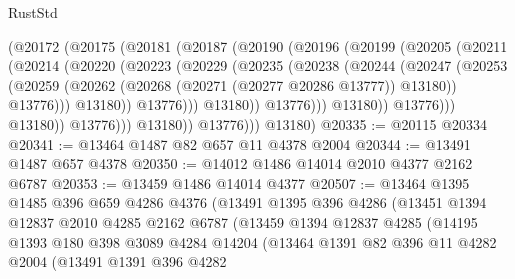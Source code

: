 \begin{lexlean}{RustStd}
\begin{coremodule}
{\begin{coremodule}
{{{{{{{{{{{{{{{{{{{{{{{{{{{{{{{                        (@20172
                          (@20175
                            (@20181
                              (@20187
                                (@20190
                                  (@20196
                                    (@20199
                                      (@20205
                                        (@20211
                                          (@20214
                                            (@20220
                                              (@20223
                                                (@20229
                                                  (@20235
                                                    (@20238
                                                      (@20244
                                                        (@20247
                                                          (@20253
                                                            (@20259
                                                              (@20262
                                                                (@20268
                                                                  (@20271 (@20277 @20286 @13777))
                                                                  @13180))
                                                              @13776)))
                                                        @13180))
                                                    @13776)))
                                              @13180))
                                          @13776)))
                                    @13180))
                                @13776)))
                          @13180))
                      @13776)))
                @13180))
            @13776)))
      @13180)
@20335 := @20115 @20334
@20341 := @13464 @1487 @82 @657 @11 @4378 @2004
@20344 := @13491 @1487 @657 @4378
@20350 := @14012 @1486 @14014 @2010 @4377 @2162 @6787
@20353 := @13459 @1486 @14014 @4377
@20507 := @13464
    @1395
    @1485
    @396
    @659
    @4286
    @4376
    (@13491
      @1395
      @396
      @4286
      (@13451
        @1394
        @12837
        @2010
        @4285
        @2162
        @6787
        (@13459
          @1394
          @12837
          @4285
          (@14195
            @1393
            @180
            @398
            @3089
            @4284
            @14204
            (@13464
              @1391
              @82
              @396
              @11
              @4282
              @2004
              (@13491
                @1391
                @396
                @4282
}}}}}}}}}}}}}}}}}}}}}}}}}}}}}}}
\end{coremodule}}
\end{coremodule}
\end{lexlean}
